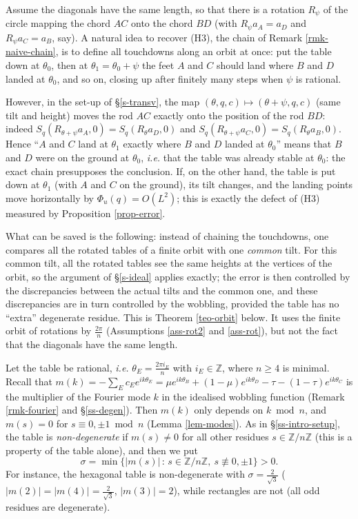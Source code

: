 \documentclass[a4paper,11pt,twoside,leqno]{article}
\newcommand{\ie}[0]{\emph{i.e.} }
\newcommand{\zz}[0]{\ensuremath{\mathbb{Z}}}
\numberwithin{equation}{section}
\begin{document}
\begin{rmk}\label{rmk-chain}
Assume the diagonals have the same length, so that there is a rotation $R_\psi$ of the circle mapping the chord $AC$ onto the chord $BD$ (with $R_\psi a_A = a_D$ and $R_\psi a_C = a_B$, say). A natural idea to recover (H3), the chain of Remark \ref{rmk-naive-chain}, is to define all touchdowns along an orbit at once: put the table down at $\theta_0$, then at $\theta_1 = \theta_0 + \psi$ the feet $A$ and $C$ should land where $B$ and $D$ landed at $\theta_0$, and so on, closing up after finitely many steps when $\psi$ is rational.

However, in the set-up of \S{}\ref{s-transv}, the map $(\theta,q,c) \mapsto (\theta + \psi, q, c)$ (same tilt and height) moves the rod $AC$ exactly onto the position of the rod $BD$: indeed $S_q(R_{\theta+\psi} a_A,0) = S_q(R_\theta a_D,0)$ and $S_q(R_{\theta+\psi} a_C,0) = S_q(R_\theta a_B,0)$. Hence ``$A$ and $C$ land at $\theta_1$ exactly where $B$ and $D$ landed at $\theta_0$'' means that $B$ and $D$ were on the ground at $\theta_0$, \ie that the table was already stable at $\theta_0$: the exact chain presupposes the conclusion. If, on the other hand, the table is put down at $\theta_1$ (with $A$ and $C$ on the ground), its tilt changes, and the landing points move horizontally by $\Phi_u(q) = O(L^2)$; this is exactly the defect of (H3) measured by Proposition \ref{prop-error}.

What can be saved is the following: instead of chaining the touchdowns, one compares all the rotated tables of a finite orbit with one \emph{common} tilt. For this common tilt, all the rotated tables see the same heights at the vertices of the orbit, so the argument of \S{}\ref{s-ideal} applies exactly; the error is then controlled by the discrepancies between the actual tilts and the common one, and these discrepancies are in turn controlled by the wobbling, provided the table has no ``extra'' degenerate residue. This is Theorem \ref{teo-orbit} below. It uses the finite orbit of rotations by $\frac{2\pi}{n}$ (Assumptions \ref{ass-rot2} and \ref{ass-rot}), but not the fact that the diagonals have the same length.
\end{rmk}

Let the table be rational, \ie $\theta_E = \frac{2\pi i_E}{n}$ with $i_E \in \zz$, where $n \geq 4$ is minimal.
Recall that $m(k) = -\sum_E c_E e^{ik\theta_E} = \mu e^{ik\theta_B} + (1-\mu) e^{ik\theta_D} - \tau - (1-\tau) e^{ik\theta_C}$ is the multiplier of the Fourier mode $k$ in the idealised wobbling function (Remark \ref{rmk-fourier} and \S{}\ref{ss-degen}). Then $m(k)$ only depends on $k \bmod n$, and $m(s) = 0$ for $s \equiv 0, \pm 1 \bmod n$ (Lemma \ref{lem-modes}). As in \S{}\ref{ss-intro-setup}, the table is \emph{non-degenerate} if $m(s) \neq 0$ for all other residues $s \in \zz/n\zz$ (this is a property of the table alone), and then we put
\[
\sigma = \min \{ |m(s)| \,:\, s \in \zz/n\zz,\ s \not\equiv 0, \pm 1 \} > 0.
\]
For instance, the hexagonal table is non-degenerate with $\sigma = \frac{2}{\sqrt{3}}$ ($|m(2)| = |m(4)| = \frac{2}{\sqrt 3}$, $|m(3)| = 2$), while rectangles are not (all odd residues are degenerate).
\end{document}

